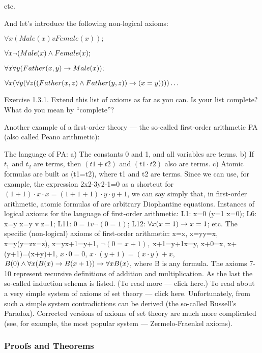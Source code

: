etc.

And let's introduce the following non-logical axioms:

\(\forall x (Male(x) v Female(x));\)

\(\forall x \neg (Male(x) \wedge  Female(x);\)

\(\forall x\forall y (Father (x, y)\rightarrow Male(x));\)

\(\forall x(\forall y(\forall z((Father(x, z)\wedge Father(y,z))\rightarrow (x=y)))) \ldots \)

Exercise 1.3.1. Extend this list of axioms as far as you can. Is your list complete? What do you mean by ``complete''?

Another example of a first-order theory --- the so-called first-order arithmetic PA (also called Peano arithmetic):

The language of PA:
a) The constants 0 and 1, and all variables are terms.
b) If \(t_1\) and \(t_2\) are terms, then \((t1+t2)\) and \((t1\cdot t2)\) also are terms.
c) Atomic formulas are built as (t1=t2), where t1 and t2 are terms.
Since we can use, for example, the expression 2x2-3y2-1=0 as a shortcut for \((1+1)\cdot x\cdot x=(1+1+1)\cdot y\cdot y+1\), we can say simply
that, in first-order arithmetic, atomic formulas of are arbitrary Diophantine equations.
Instances of logical axioms for the language of first-order arithmetic:
L1: x=0 \IMPLIES  (y=1 \IMPLIES  x=0);
L6: x=y \IMPLIES  x=y v z=1;
L11: \(0=1 v \neg (0=1)\);
L12: \(\forall x(x=1) \rightarrow  x=1\);
etc.
The specific (non-logical) axioms of first-order arithmetic:
x=x,
x=y\IMPLIES y=x,
x=y\IMPLIES (y=z\IMPLIES x=z),
x=y\IMPLIES x+1=y+1,
\(\neg (0=x+1),\)
x+1=y+1\IMPLIES x=y,
x+0=x,
x+(y+1)=(x+y)+1,
\(x\cdot 0=0\),
\(x\cdot (y+1)=(x\cdot y)+x\),
\(B(0) \wedge  \forall x(B(x)\rightarrow B(x+1))\rightarrow \forall xB(x)\), where B is any formula.
The axioms 7-10 represent recursive definitions of addition and multiplication. As the last the so-called induction schema is
listed. (To read more --- click here.)
To read about a very simple system of axioms of set theory --- click here. Unfortunately, from such a simple system
contradictions can be derived (the so-called Russell's Paradox). Corrected versions of axioms of set theory are much more
complicated (see, for example, the most popular system --- Zermelo-Fraenkel axioms).

\subsubsection{Proofs and Theorems}

